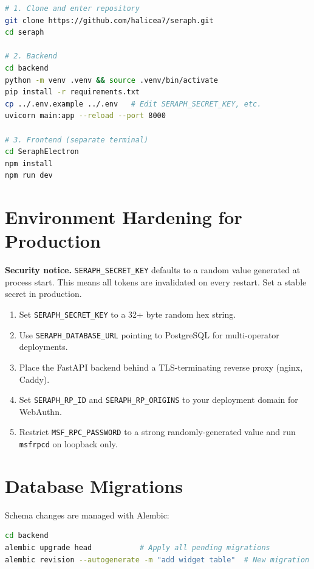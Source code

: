 \documentclass[11pt,a4paper,twoside,openright]{book}
\begin{document}
\begin{codebox}
\begin{lstlisting}[language=bash, numbers=none]
# 1. Clone and enter repository
git clone https://github.com/halicea7/seraph.git
cd seraph

# 2. Backend
cd backend
python -m venv .venv && source .venv/bin/activate
pip install -r requirements.txt
cp ../.env.example ../.env   # Edit SERAPH_SECRET_KEY, etc.
uvicorn main:app --reload --port 8000

# 3. Frontend (separate terminal)
cd SeraphElectron
npm install
npm run dev
\end{lstlisting}
\end{codebox}

\section{Environment Hardening for Production}

\begin{warningbox}
\textbf{Security notice.} \texttt{SERAPH\_SECRET\_KEY} defaults to a random value generated at process start. This means all tokens are invalidated on every restart. Set a stable secret in production.
\end{warningbox}

\begin{enumerate}[leftmargin=*]
  \item Set \texttt{SERAPH\_SECRET\_KEY} to a 32+ byte random hex string.
  \item Use \texttt{SERAPH\_DATABASE\_URL} pointing to PostgreSQL for multi-operator deployments.
  \item Place the FastAPI backend behind a TLS-terminating reverse proxy (nginx, Caddy).
  \item Set \texttt{SERAPH\_RP\_ID} and \texttt{SERAPH\_RP\_ORIGINS} to your deployment domain for WebAuthn.
  \item Restrict \texttt{MSF\_RPC\_PASSWORD} to a strong randomly-generated value and run \texttt{msfrpcd} on loopback only.
\end{enumerate}

\section{Database Migrations}

Schema changes are managed with Alembic:

\begin{codebox}
\begin{lstlisting}[language=bash, numbers=none]
cd backend
alembic upgrade head           # Apply all pending migrations
alembic revision --autogenerate -m "add widget table"  # New migration
\end{lstlisting}
\end{codebox}
\end{document}
